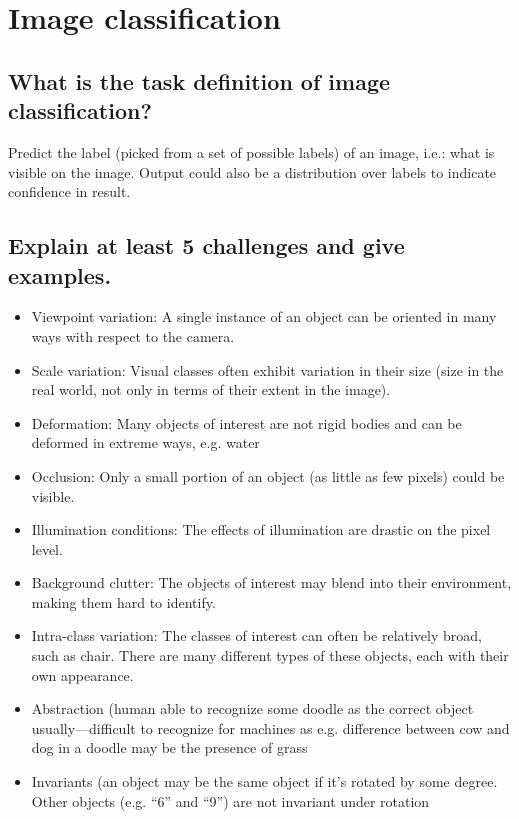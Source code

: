 %
\section{Image classification}
\subsection{What is the task definition of image classification?}
Predict the label (picked from a set of possible labels) of an image, i.e.: what is visible on the image. Output could also be a distribution over labels to indicate confidence in result.

\subsection{Explain at least 5 challenges and give examples.}
\begin{itemize}
\item Viewpoint variation: A single instance of an object can be oriented in many ways with respect to the camera.
\item Scale variation: Visual classes often exhibit variation in their size (size in the real world, not only in terms of their extent in the image).
\item Deformation: Many objects of interest are not rigid bodies and can be deformed in extreme ways, e.g. water
\item Occlusion: Only a small portion of an object (as little as few pixels) could be visible.
\item Illumination conditions: The effects of illumination are drastic on the pixel level.
\item Background clutter: The objects of interest may blend into their environment, making them hard to identify.
\item Intra-class variation: The classes of interest can often be relatively broad, such as chair. There are many different types of these objects, each with their own appearance.
\item Abstraction (human able to recognize some doodle as the correct object usually---difficult to recognize for machines as e.g. difference between cow and dog in a doodle may be the presence of grass
\item Invariants (an object may be the same object if it's rotated by some degree. Other objects (e.g. ``6'' and ``9'') are not invariant under rotation
\end{itemize}

